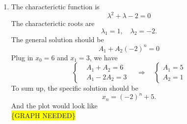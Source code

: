 \documentclass[
    classnum=MATH564,
    classname=MATHEMATICAL\ MODELING,
    due=January\ 28\,\ 2020,
    author=Gabrielle\ Streeter\qquad Hannah\ Wu\qquad\ Minghang\ Li,
    authorshort=Streeter\ \&\ Wu\ \&\ Li,
    teacher= Zachary\ M.\ Boyd,
    hw=1
]{hw-template}
\newcommand{\requiregraph}{\colorbox{yellow}{\{GRAPH NEEDED\}}}
\begin{document}
\begin{homeworkProblem}
\begin{enumerate}
    \item The characterictic function is \[
        \lambda^2 + \lambda -2 = 0
    \]
    The characterictic roots are \[
        \lambda_1 = 1, \quad \lambda_2 = -2.
    \]
    The general solution should be \[
        A_1 + A_2 (-2)^n = 0
    \]
    Plug in $x_0 = 6$ and $x_1 = 3$, we have \[
        \left\{
        \begin{aligned}
            &A_1 + A_2  = 6\\
            &A_1 - 2A_2 = 3
        \end{aligned}
        \right.
        \quad
        \Rightarrow
        \quad
        \left\{
        \begin{aligned}
            A_1 = 5\\
            A_2 = 1
        \end{aligned}
        \right.
    \]
    To sum up, the specific solution should be $$
        x_n = (-2)^n + 5.
    $$
    And the plot would look like\\
    \requiregraph
\end{enumerate}

\end{homeworkProblem}

\pagebreak
\end{document}
